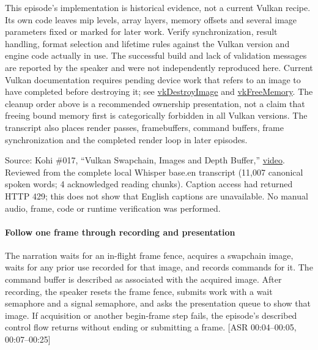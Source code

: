 This episode's implementation is historical evidence, not a current Vulkan recipe. Its own code leaves mip levels, array layers, memory offsets and several image parameters fixed or marked for later work. Verify synchronization, result handling, format selection and lifetime rules against the Vulkan version and engine code actually in use. The successful build and lack of validation messages are reported by the speaker and were not independently reproduced here. Current Vulkan documentation requires pending device work that refers to an image to have completed before destroying it; see \href{https://docs.vulkan.org/spec/latest/chapters/resources.html}{vkDestroyImage} and \href{https://docs.vulkan.org/spec/latest/chapters/memory.html}{vkFreeMemory}. The cleanup order above is a recommended ownership presentation, not a claim that freeing bound memory first is categorically forbidden in all Vulkan versions. The transcript also places render passes, framebuffers, command buffers, frame synchronization and the completed render loop in later episodes.

Source: Kohi \#017, ``Vulkan Swapchain, Images and Depth Buffer,'' \href{https://www.youtube.com/watch?v=jWKVb_QdSNM}{video}. Reviewed from the complete local Whisper base.en transcript (11,007 canonical spoken words; 4 acknowledged reading chunks). Caption access had returned HTTP 429; this does not show that English captions are unavailable. No manual audio, frame, code or runtime verification was performed.

\paragraph{Follow one frame through recording and presentation}\label{06-engine-ii-ch026-follow-one-frame-through-recording-and-presentation}

\hypertarget{06-engine-ii-ch026-follow-one-frame-through-recording-and-presentation}{}

The narration waits for an in-flight frame fence, acquires a swapchain image, waits for any prior use recorded for that image, and records commands for it. The command buffer is described as associated with the acquired image. After recording, the speaker resets the frame fence, submits work with a wait semaphore and a signal semaphore, and asks the presentation queue to show that image. If acquisition or another begin-frame step fails, the episode's described control flow returns without ending or submitting a frame. {[}ASR 00:04--00:05, 00:07--00:25{]}

